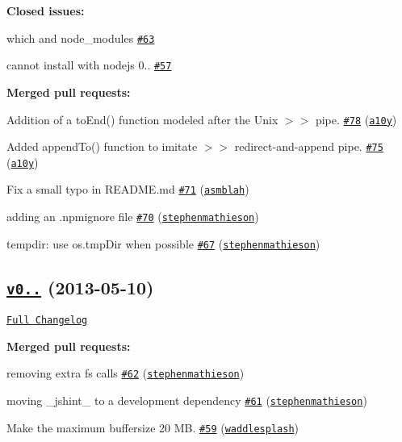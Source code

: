 {\bfseries Closed issues\+:}


\begin{DoxyItemize}
\item which and node\+\_\+modules \href{https://github.com/shelljs/shelljs/issues/63}{\tt \#63}
\item cannot install with nodejs 0.. \href{https://github.com/shelljs/shelljs/issues/57}{\tt \#57}
\end{DoxyItemize}

{\bfseries Merged pull requests\+:}


\begin{DoxyItemize}
\item Addition of a to\+End() function modeled after the Unix $>$$>$ pipe. \href{https://github.com/shelljs/shelljs/pull/78}{\tt \#78} (\href{https://github.com/a10y}{\tt a10y})
\item Added append\+To() function to imitate \textquotesingle{}$>$$>$\textquotesingle{} redirect-\/and-\/append pipe. \href{https://github.com/shelljs/shelljs/pull/75}{\tt \#75} (\href{https://github.com/a10y}{\tt a10y})
\item Fix a small typo in R\+E\+A\+D\+M\+E.\+md \href{https://github.com/shelljs/shelljs/pull/71}{\tt \#71} (\href{https://github.com/asmblah}{\tt asmblah})
\item adding an {\ttfamily .npmignore} file \href{https://github.com/shelljs/shelljs/pull/70}{\tt \#70} (\href{https://github.com/stephenmathieson}{\tt stephenmathieson})
\item tempdir\+: use {\ttfamily os.\+tmp\+Dir} when possible \href{https://github.com/shelljs/shelljs/pull/67}{\tt \#67} (\href{https://github.com/stephenmathieson}{\tt stephenmathieson})
\end{DoxyItemize}

\subsection*{\href{https://github.com/shelljs/shelljs/tree/v0.1.4}{\tt v0..} (2013-\/05-\/10)}

\href{https://github.com/shelljs/shelljs/compare/v0.1.3...v0.1.4}{\tt Full Changelog}

{\bfseries Merged pull requests\+:}


\begin{DoxyItemize}
\item removing extra fs calls \href{https://github.com/shelljs/shelljs/pull/62}{\tt \#62} (\href{https://github.com/stephenmathieson}{\tt stephenmathieson})
\item moving \+\_\+jshint\+\_\+ to a development dependency \href{https://github.com/shelljs/shelljs/pull/61}{\tt \#61} (\href{https://github.com/stephenmathieson}{\tt stephenmathieson})
\item Make the maximum buffersize 20 MB. \href{https://github.com/shelljs/shelljs/pull/59}{\tt \#59} (\href{https://github.com/waddlesplash}{\tt waddlesplash})
\end{DoxyItemize}

